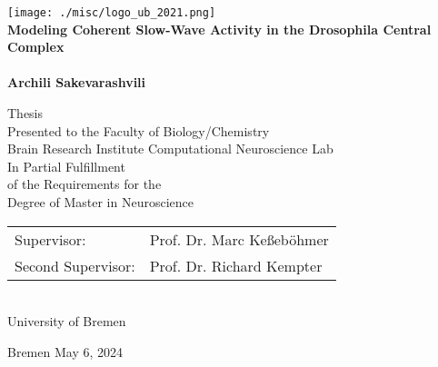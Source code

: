 \documentclass[../main.tex]{subfiles}
\begin{document}
\thispagestyle{empty}

\begin{center}
    \vspace*{0.5cm}
    \texttt{[image: ./misc/logo\_ub\_2021.png]}\\[10 mm]
        
    \textbf{\huge Modeling Coherent Slow-Wave Activity in the Drosophila Central Complex \\\phantom{}}\\[5 mm]

        {\large \textbf{Archili Sakevarashvili}\\[1 cm]}

        {\large Thesis \\Presented to the Faculty of Biology/Chemistry\\
        Brain Research Institute Computational Neuroscience Lab}\\[1 cm]
    
    {\large In Partial Fulfillment \\of the Requirements for the \\[1 mm]
        Degree of Master in Neuroscience}\\[2 cm]
    
    \begin{tabular}{l l}
        {\large Supervisor:} & {\large Prof. Dr. Marc Keßeböhmer} \\
            {\large Second Supervisor:} & {\large Prof. Dr. Richard Kempter}
    \end{tabular}\\[1.5 cm]

    {\Large University of Bremen}

    {\large Bremen May 6, 2024}	
\end{center}
\end{document}
